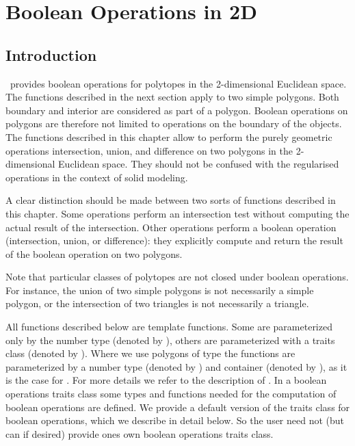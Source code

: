  
%
 


\cleardoublepage
\chapter{Boolean Operations in 2D} \label{Bops}

\section{Introduction}

\cgal\ provides boolean operations for polytopes in the 2-dimensional 
Euclidean space. The functions described in 
the next section apply to two simple
polygons. Both boundary and interior are considered as part of a polygon.
Boolean operations on polygons are therefore not limited to operations
on the boundary of the objects. 
The functions described in this chapter 
allow to perform the purely geometric operations 
intersection, union, and difference on two polygons 
in the 2-dimensional Euclidean space. They should not be confused with
the regularised operations in the context of solid modeling.

A clear distinction should be made between two sorts of functions
described in this chapter. Some operations perform an intersection
test without computing the actual result of the intersection. 
Other operations perform a boolean operation (intersection, 
union, or difference): they explicitly compute and return the result
of the boolean operation on two polygons.

Note that particular classes of polytopes are not closed under
boolean operations. For instance, the union of two simple polygons is
not necessarily a simple polygon, or the intersection of two triangles
is not necessarily a triangle.

All functions described below are template functions. Some are
parameterized only by the number type (denoted by ), 
others are parameterized with a traits class (denoted by
). 
Where we use polygons of type
 the functions are parameterized by a 
number type (denoted by ) and container (denoted by
), as it is the case for .
For more details we refer to the description of .
In a boolean operations traits
class some types and functions needed for the computation of 
boolean operations are defined. We provide a default version of the
traits class for boolean operations, which we describe in detail below.
So the user need not (but can if desired) provide ones own boolean operations
traits class.


